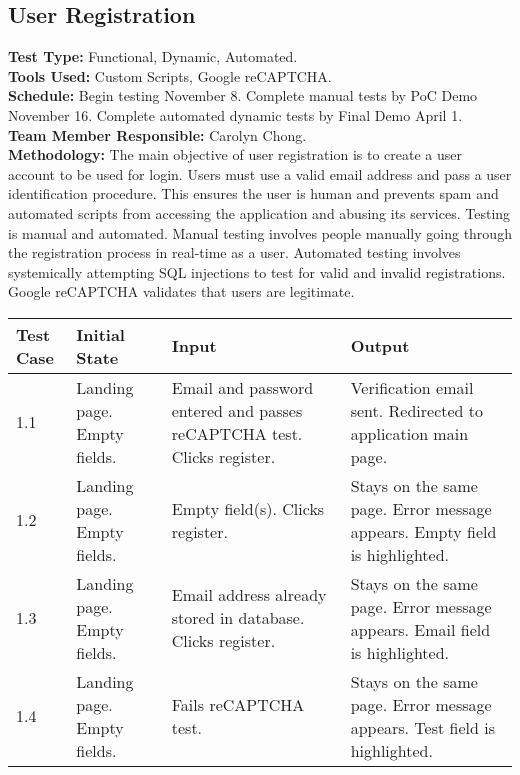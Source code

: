\documentclass[12pt]{article}
\begin{document}
\subsection{User Registration} 
\textbf{Test Type:} Functional, Dynamic, Automated. \\
\textbf{Tools Used:} Custom Scripts, Google reCAPTCHA. \\
\textbf{Schedule:} Begin testing November 8. Complete manual tests by PoC Demo November 16. Complete automated dynamic tests by Final Demo April 1. \\
\textbf{Team Member Responsible:} Carolyn Chong.\\
\textbf{Methodology:} The main objective of user registration is to create a user account to be used for login. Users must use a valid email address and pass a user identification procedure. This ensures the user is human and prevents spam and automated scripts from accessing the application and abusing its services. Testing is manual and automated. Manual testing involves people manually going through the registration process in real-time as a user. Automated testing involves systemically attempting SQL injections to test for valid and invalid registrations. Google reCAPTCHA validates that users are legitimate.

\begin{longtable}{|p{2cm}|p{3cm}|p{5cm}|p{5cm}|}
\hline
\textbf{Test Case}  & \textbf{Initial State} & \textbf{Input} & \textbf{Output} \\ \hline
1.1 & Landing page. Empty fields. & Email and password entered and passes reCAPTCHA test. Clicks register. & Verification email sent. Redirected to application main page. \\ 
\hline
1.2 & Landing page. Empty fields. & Empty field(s). Clicks register. & Stays on the same page. Error message appears. Empty field is highlighted. \\
\hline
1.3 & Landing page. Empty fields. & Email address already stored in database. Clicks register. & Stays on the same page. Error message appears. Email field is highlighted. \\
\hline
1.4 & Landing page. Empty fields. & Fails reCAPTCHA test. & Stays on the same page. Error message appears. Test field is highlighted. \\
\hline
\end{longtable}



\end{document}
